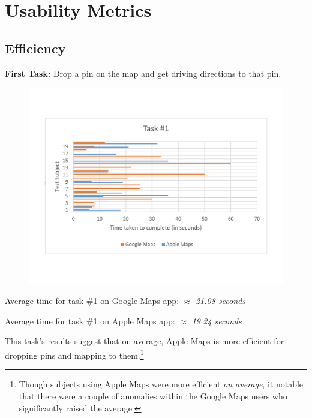 \documentclass[a4paper; 11pt]{article}
\begin{document}
\vspace{-.1in}
\section{Usability Metrics}
\vspace{-.1in}
\subsection{Efficiency}
\par
\textbf{First Task: }Drop a pin on the map and get driving directions to that pin.
\vspace{-.4in}
\begin{figure}[ht]
\begin{center}
\vspace{-.1in}
\includegraphics[keepaspectratio, width=.8\textwidth ]{task1.pdf}
\end{center}
\end{figure}
\begin{center}
\vspace{-.6in}
\par
Average time for task \#1 on Google Maps app: $ \approx $ \textit{21.08 seconds}
\par
Average time for task \#1 on Apple Maps app: $ \approx $ \textit{19.24 seconds}
\end{center}
\par
\noindent
This task's results suggest that on average, Apple Maps is more efficient for dropping pins and mapping to them.\footnote{Though subjects using Apple Maps were more efficient \textit{on average}, it notable that there were a couple of anomalies within the Google Maps users who significantly raised the average.} %
\end{document}
